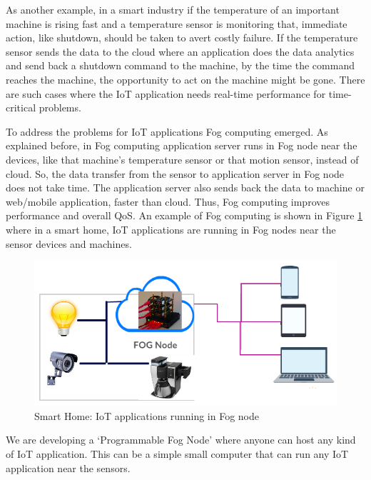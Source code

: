 As another example, in a smart industry if the temperature of an important machine is rising fast and a temperature sensor is monitoring that, immediate action, like shutdown, should be taken to avert costly failure. If the temperature sensor sends the data to the cloud where an application does the data analytics and send back a shutdown command to the machine, by the time the command reaches the machine, the opportunity to act on the machine might be gone. There are such cases where the \ac{IoT} application needs real-time performance for time-critical problems.

To address the problems for \ac{IoT} applications Fog computing emerged. As explained before, in Fog computing application server runs in Fog node near the devices, like that machine's temperature sensor or that motion sensor, instead of cloud. So, the data transfer from the sensor to application server in Fog node does not take time. The application server also sends back the data to machine or web/mobile application, faster than cloud. Thus, Fog computing improves performance and  overall \ac{QoS}. An example of Fog computing is shown in Figure \ref{img:iotfog} where in a smart home, \ac{IoT} applications are running in Fog nodes near the sensor devices and machines.

\begin{figure}[H]
  \centering
  \includegraphics[width=.50\textwidth]{img/iot-fog.png}
  \caption{Smart Home: IoT applications running in Fog node}\label{img:iotfog}
\end{figure}

We are developing a `Programmable Fog Node' where anyone can host any kind of \ac{IoT} application. This can be a simple small computer that can run any \ac{IoT} application near the sensors.

